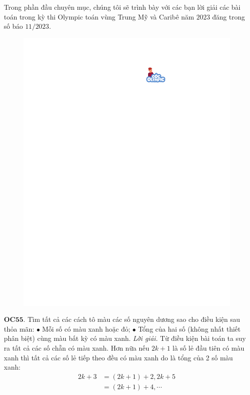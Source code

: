 \begin{multicols}{2}
	Trong phần đầu chuyên mục, chúng tôi sẽ trình bày với các bạn lời giải các bài toán trong kỳ thi Olympic toán vùng Trung Mỹ và Caribê năm $2023$ đăng trong số báo $11/2023$. 
	\begin{figure}[H]
		\vspace*{-5pt}
		\centering
		\captionsetup{labelformat= empty, justification=centering}
		\includegraphics[width= 0.85\linewidth]{gocolympic}
		\vspace*{-15pt}
	\end{figure}
	{\bf\color{cackithi} OC$\pmb{55.}$} Tìm tất cả các cách tô màu các số nguyên dương sao cho điều kiện sau thỏa mãn:  
	\vskip 0.1cm
	$\bullet$ Mỗi số có màu xanh hoặc đỏ;
	\vskip 0.1cm
	$\bullet$  Tổng của hai số (không nhất thiết phân biệt) cùng màu bất kỳ có màu xanh.
	\vskip 0.1cm
	\textit{Lời giải.} Từ điều kiện bài toán ta suy ra tất cả các số chẵn có màu xanh. Hơn nữa nếu $2k+1$ là số lẻ đầu tiên có màu xanh thì tất cả các số lẻ tiếp theo đều có màu xanh do là tổng của 2 số màu xanh: 
	\begin{align*}
		2k+3&=(2k+1) + 2, 2k+5\\
		&=(2k+1) + 4, \cdots

\end{align*}
\end{multicols}
